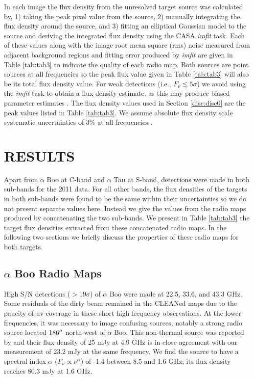 \documentclass[iop]{emulateapj}
\begin{document}
In each image the flux density from the unresolved target source was calculated by, 1) taking the peak pixel value from the source, 2) manually integrating the flux density around the source, and 3) fitting an elliptical Gaussian model to the source and deriving the integrated flux density using the CASA \textit{imfit} task. Each of these values along with the image root mean square (rms) noise measured from adjacent background regions and fitting error produced by \textit{imfit} are given in Table \ref{tab:tab3} to indicate the quality of each radio map. Both sources are point sources at all frequencies so the peak flux value given in Table \ref{tab:tab3} will also be its total flux density value. For weak detections (i.e., $F_{\nu} \lesssim 5\sigma$) we avoid using the \textit{imfit} task to obtain a flux density estimate, as this may produce biased parameter estimates \citep{1999ASPC..180.....T}. The flux density values used in Section \ref{disc:disc0} are the peak values listed in Table \ref{tab:tab3}. We assume absolute flux density scale systematic uncertainties of  3\% at all frequencies \citep{2013ApJS..204...19P}.

\section{RESULTS} 

Apart from $\alpha$ Boo at C-band and $\alpha$ Tau at S-band, detections were made in both sub-bands for the 2011 data. For all other bands, the flux densities of the targets in both sub-bands were found to be the same within their uncertainties so we do not present separate values here. Instead we give the values from the radio maps produced by concatenating the two sub-bands. We present in Table \ref{tab:tab3} the target flux densities extracted from these concatenated radio maps. In the following two sections we briefly discuss the properties of these radio maps for both targets.

\subsection{$\alpha$ Boo Radio Maps} \label{results1} 
High S/N detections ($>$19$\sigma$) of $\alpha$ Boo were made at 22.5, 33.6, and 43.3 GHz. Some residuals of the dirty beam remained in the CLEANed maps due to the paucity of uv-coverage in these short high frequency observations. At the lower frequencies, it was necessary to image confusing sources, notably a strong radio source located $186\mbox{$^{\prime\prime}$}$ north-west of $\alpha$ Boo. This non-thermal source was reported by \cite{1986AJ.....91..602D} and their flux density of 25 mJy at 4.9 GHz is in close agreement with our measurement of 23.2 mJy at the same frequency. We find the source to have a spectral index $\alpha$ ($F_{\nu} \propto \nu ^{\alpha}$) of -1.4 between 8.5 and 1.6 GHz; its flux density reaches 80.3 mJy at 1.6 GHz.
\end{document}
